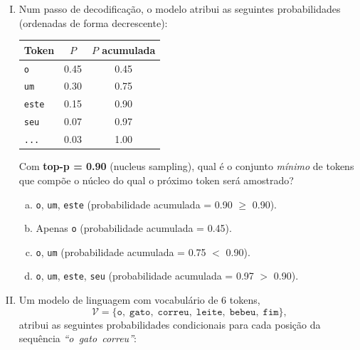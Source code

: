 \documentclass{dlproblemset}
\begin{document}
\begin{enumerate}[I)]
\item Num passo de decodificação, o modelo atribui as seguintes
      probabilidades (ordenadas de forma decrescente):

\begin{center}
\begin{tabular}{lcc}
  \toprule
  Token & $P$ & $P$ acumulada \\
  \midrule
  \texttt{o}    & 0.45 & 0.45 \\
  \texttt{um}   & 0.30 & 0.75 \\
  \texttt{este} & 0.15 & 0.90 \\
  \texttt{seu}  & 0.07 & 0.97 \\
  \texttt{...}  & 0.03 & 1.00 \\
  \bottomrule
\end{tabular}
\end{center}

Com \textbf{top-p = 0.90} (nucleus sampling), qual é o conjunto
\emph{mínimo} de tokens que compõe o núcleo do qual o próximo token
será amostrado?

\begin{enumerate}[a)]
    \item \texttt{o}, \texttt{um}, \texttt{este}
          (probabilidade acumulada = 0.90 $\ge$ 0.90).
    \item Apenas \texttt{o} (probabilidade acumulada = 0.45).
    \item \texttt{o}, \texttt{um}
          (probabilidade acumulada = 0.75 $<$ 0.90).
    \item \texttt{o}, \texttt{um}, \texttt{este}, \texttt{seu}
          (probabilidade acumulada = 0.97 $>$ 0.90).
\end{enumerate}

\item Um modelo de linguagem com vocabulário de 6 tokens,
      \[
        \mathcal{V} = \{\texttt{o},\;\texttt{gato},\;\texttt{correu},\;
        \texttt{leite},\;\texttt{bebeu},\;\texttt{fim}\},
      \]
      atribui as seguintes probabilidades condicionais para cada posição
      da sequência \textit{``o~gato~correu''}:


\end{enumerate}
\end{document}
